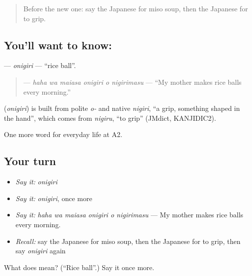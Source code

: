 \label{lesson:JA-C180-onigiri}



\begin{quote}
Before the new one: say the Japanese for miso soup, then the Japanese for to grip.
\end{quote}

\subsection*{You'll want to know: }
\textbf{} — \emph{onigiri} — \textquotedblleft{}rice ball\textquotedblright{}.

\begin{quote}
\textbf{   } — \emph{haha wa maiasa onigiri o nigirimasu} — \textquotedblleft{}My mother makes rice balls every morning.\textquotedblright{}
\end{quote}

\begin{cousinweb}
\textbf{} (\emph{onigiri}) is built from polite \emph{o-} and native \emph{nigiri}, \textquotedblleft{}a grip, something shaped in the hand\textquotedblright{}, which comes from \emph{nigiru}, \textquotedblleft{}to grip\textquotedblright{} (JMdict, KANJIDIC2).
\end{cousinweb}

\begin{grammarlens}[title={What you've built}]
One more word for everyday life at A2.
\end{grammarlens}

\subsection*{Your turn}
\begin{itemize}
\raggedright
  \item \emph{Say it:} \emph{onigiri}
  \item \emph{Say it:} \emph{onigiri}, once more
  \item \emph{Say it:} \emph{haha wa maiasa onigiri o nigirimasu} — My mother makes rice balls every morning.
  \item \emph{Recall:} say the Japanese for miso soup, then the Japanese for to grip, then say \emph{onigiri} again
\end{itemize}

\begin{tcolorbox}[breakable,colback=teal!4,colframe=teal!35!black,title={Before you move on}]
What does  mean? (\textquotedblleft{}Rice ball\textquotedblright{}.) Say it once more.
\end{tcolorbox}
